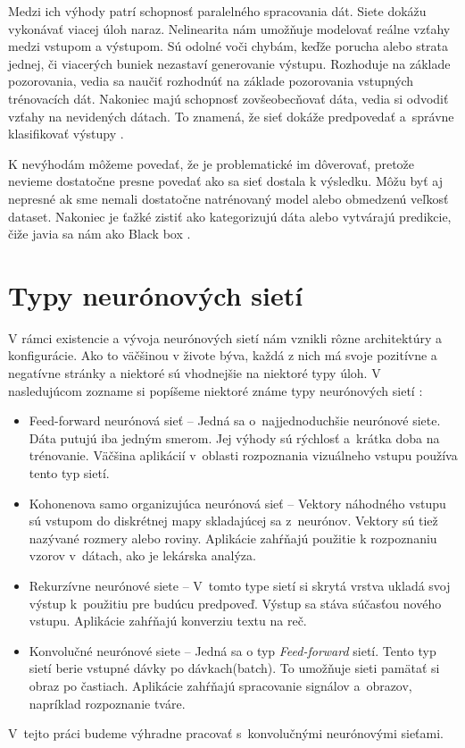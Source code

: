 Medzi ich výhody patrí schopnosť paralelného spracovania dát. Siete dokážu vykonávať viacej úloh naraz. Nelinearita nám umožňuje modelovať reálne vzťahy medzi vstupom a výstupom. Sú odolné voči chybám, keďže porucha alebo strata jednej, či viacerých buniek nezastaví generovanie výstupu. Rozhoduje na základe pozorovania, vedia sa naučiť rozhodnúť na základe pozorovania vstupných trénovacích dát. Nakoniec majú schopnosť zovšeobecňovať dáta, vedia si odvodiť vzťahy na nevidených dátach. To znamená, že sieť dokáže predpovedať a~správne klasifikovať výstupy \cite{cons_prons_NN}.

K nevýhodám môžeme povedať, že je problematické im dôverovať, pretože nevieme dostatočne presne povedať ako sa sieť dostala k výsledku. Môžu byť aj nepresné ak sme nemali dostatočne natrénovaný model alebo obmedzenú veľkosť dataset. Nakoniec je ťažké zistiť ako kategorizujú dáta alebo vytvárajú predikcie, čiže javia sa nám ako Black box \cite{cons_prons_NN}.

\section{Typy neurónových sietí}
V rámci existencie a vývoja neurónových sietí nám vznikli rôzne architektúry a konfigurácie. Ako to väčšinou v živote býva, každá z nich má svoje pozitívne a negatívne stránky a niektoré sú vhodnejšie na niektoré typy úloh. V nasledujúcom zozname si popíšeme niektoré známe typy neurónových sietí \cite{simplilearn}:
\begin{itemize}
    \item Feed-forward neurónová sieť -- Jedná sa o~najjednoduchšie neurónové siete. Dáta putujú iba jedným smerom. Jej výhody sú rýchlosť a~krátka doba na trénovanie. Väčšina aplikácií v~oblasti rozpoznania vizuálneho vstupu používa tento typ sietí.
    \item Kohonenova samo organizujúca neurónová sieť -- Vektory náhodného vstupu sú vstupom do diskrétnej mapy skladajúcej sa z~neurónov. Vektory sú tiež nazývané rozmery alebo roviny. Aplikácie zahŕňajú použitie k rozpoznaniu vzorov v~dátach, ako je lekárska analýza.
    \item Rekurzívne neurónové siete -- V~tomto type sietí si skrytá vrstva ukladá svoj výstup k~použitiu pre budúcu predpoveď. Výstup sa stáva súčasťou nového vstupu. Aplikácie zahŕňajú konverziu textu na reč.
    \item Konvolučné neurónové siete -- Jedná sa o typ \textit{Feed-forward} sietí. Tento typ sietí berie vstupné dávky po dávkach(batch). To umožňuje sieti pamätať si obraz po častiach. Aplikácie zahŕňajú spracovanie signálov a~obrazov, napríklad rozpoznanie tváre.
\end{itemize}
V~tejto práci budeme výhradne pracovať s~konvolučnými neurónovými sieťami.


